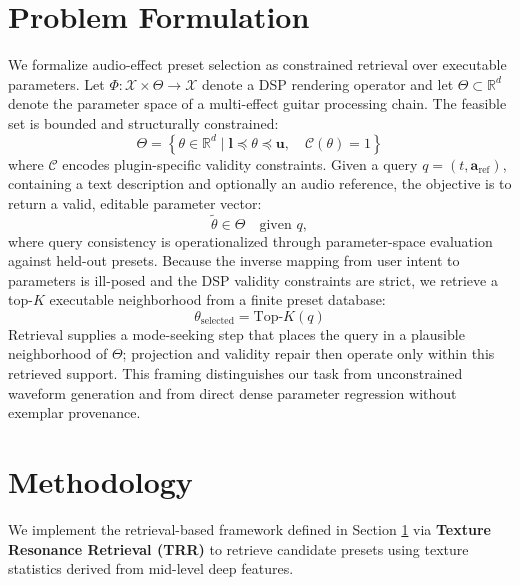 \section{Problem Formulation}
\label{sec:problem_formulation}

We formalize audio-effect preset selection as constrained retrieval over executable parameters. Let $\Phi:\mathcal{X}\times\Theta\rightarrow\mathcal{X}$ denote a DSP rendering operator and let $\Theta\subset\mathbb{R}^{d}$ denote the parameter space of a multi-effect guitar processing chain. The feasible set is bounded and structurally constrained:
\begin{equation}
    \label{eq:feasible_set}
    \Theta = \left\{ \theta \in \mathbb{R}^d \mid \mathbf{l} \preceq \theta \preceq \mathbf{u}, \quad \mathcal{C}(\theta) = 1 \right\}
\end{equation}
where $\mathcal{C}$ encodes plugin-specific validity constraints. Given a query $q=(t,\mathbf{a}_{\mathrm{ref}})$, containing a text description and optionally an audio reference, the objective is to return a valid, editable parameter vector:
\begin{equation}
	\tilde{\theta} \in \Theta \quad \text{given } q,
\end{equation}
where query consistency is operationalized through parameter-space evaluation against held-out presets. Because the inverse mapping from user intent to parameters is ill-posed and the DSP validity constraints are strict, we retrieve a top-$K$ executable neighborhood from a finite preset database:
\begin{equation}
	\theta_{\text{selected}} = \text{Top-}K(q)
\end{equation}
Retrieval supplies a mode-seeking step that places the query in a plausible neighborhood of $\Theta$; projection and validity repair then operate only within this retrieved support. This framing distinguishes our task from unconstrained waveform generation and from direct dense parameter regression without exemplar provenance.

\section{Methodology}
\label{sec:methodology}

We implement the retrieval-based framework defined in Section \ref{sec:problem_formulation} via \textbf{Texture Resonance Retrieval (TRR)} to retrieve candidate presets using texture statistics derived from mid-level deep features.

